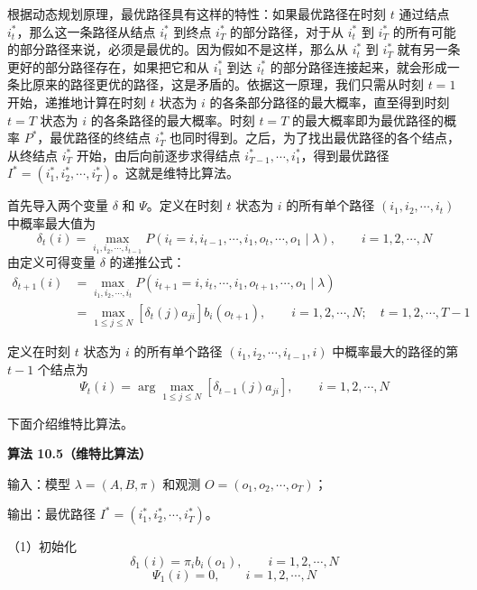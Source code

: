 \documentclass[UTF8, 12pt, fontset=fandol, oneside]{ctexart}
\begin{document}
根据动态规划原理，最优路径具有这样的特性：如果最优路径在时刻 $t$ 通过结点 $i_t^*$，那么这一条路径从结点 $i_t^*$ 到终点 $i_T^*$ 的部分路径，对于从 $i_t^*$ 到 $i_T^*$ 的所有可能的部分路径来说，必须是最优的。因为假如不是这样，那么从 $i_t^*$ 到 $i_T^*$ 就有另一条更好的部分路径存在，如果把它和从 $i_1^*$ 到达 $i_t^*$ 的部分路径连接起来，就会形成一条比原来的路径更优的路径，这是矛盾的。依据这一原理，我们只需从时刻 $t=1$ 开始，递推地计算在时刻 $t$ 状态为 $i$ 的各条部分路径的最大概率，直至得到时刻 $t=T$ 状态为 $i$ 的各条路径的最大概率。时刻 $t=T$ 的最大概率即为最优路径的概率 $P^*$，最优路径的终结点 $i_T^*$ 也同时得到。之后，为了找出最优路径的各个结点，从终结点 $i_T^*$ 开始，由后向前逐步求得结点 $i_{T-1}^*,\cdots,i_1^*$，得到最优路径 $I^*=(i_1^*,i_2^*,\cdots,i_T^*)$。这就是维特比算法。

首先导入两个变量 $\delta$ 和 $\Psi$。定义在时刻 $t$ 状态为 $i$ 的所有单个路径 $(i_1,i_2,\cdots,i_t)$ 中概率最大值为
\begin{equation}
  \delta_t(i)=\max_{i_1,i_2,\cdots,i_{t-1}}P(i_t=i,i_{t-1},\cdots,i_1,o_t,\cdots,o_1\mid\lambda),
  \qquad i=1,2,\cdots,N
  \tag{10.44}
\end{equation}
由定义可得变量 $\delta$ 的递推公式：
\begin{equation}
\begin{aligned}
  \delta_{t+1}(i)
  &=\max_{i_1,i_2,\cdots,i_t}P(i_{t+1}=i,i_t,\cdots,i_1,o_{t+1},\cdots,o_1\mid\lambda)\\
  &=\max_{1\le j\le N}[\delta_t(j)a_{ji}]b_i(o_{t+1}),\qquad
  i=1,2,\cdots,N;\quad t=1,2,\cdots,T-1
\end{aligned}
  \tag{10.45}
\end{equation}

定义在时刻 $t$ 状态为 $i$ 的所有单个路径 $(i_1,i_2,\cdots,i_{t-1},i)$ 中概率最大的路径的第 $t-1$ 个结点为
\begin{equation}
  \Psi_t(i)=\arg\max_{1\le j\le N}[\delta_{t-1}(j)a_{ji}],\qquad i=1,2,\cdots,N
  \tag{10.46}
\end{equation}

下面介绍维特比算法。

\noindent\textbf{算法 10.5（维特比算法）}\quad

输入：模型 $\lambda=(A,B,\pi)$ 和观测 $O=(o_1,o_2,\cdots,o_T)$；

输出：最优路径 $I^*=(i_1^*,i_2^*,\cdots,i_T^*)$。

（1）初始化
\[
  \delta_1(i)=\pi_i b_i(o_1),\qquad i=1,2,\cdots,N
\]
\[
  \Psi_1(i)=0,\qquad i=1,2,\cdots,N
\]
\end{document}
